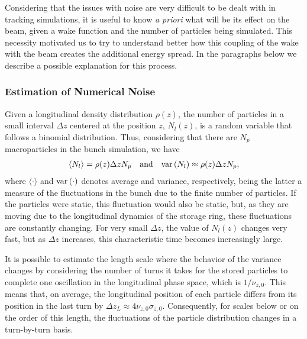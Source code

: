     Considering that the issues with noise are very difficult to be dealt with in tracking simulations, it is useful to know \emph{a priori} what will be its effect on the beam, given a wake function and the number of particles being simulated. This necessity motivated us to try to understand better how this coupling of the wake with the beam creates the additional energy spread. In the paragraphs below we describe a possible explanation for this process.

\subsubsection{Estimation of Numerical Noise}

    Given a longitudinal density distribution $\rho(z)$, the number of particles in a small interval $\Delta z$ centered at the position $z$, $N_l(z)$, is a random variable that follows a binomial distribution. Thus, considering that there are $N_p$ macroparticles in the bunch simulation, we have
    \begin{align}
        \langle N_l \rangle = \rho(z)\Delta z N_p
        \quad \text{and}\quad
        \text{var}\left(N_l\right) \approx \rho(z)\Delta z N_p,
    \end{align}
    where $\langle\cdot\rangle$ and $\text{var}\left(\cdot\right)$ denotes average and variance, respectively, being the latter a measure of the fluctuations in the bunch due to the finite number of particles. If the particles were static, this fluctuation would also be static, but, as they are moving due to the longitudinal dynamics of the storage ring, these fluctuations are constantly changing. For very small $\Delta z$, the value of $N_l(z)$ changes very fast, but as $\Delta z$ increases, this characteristic time becomes increasingly large.

    It is possible to estimate the length scale where the behavior of the variance changes by considering the number of turns it takes for the stored particles to complete one oscillation in the longitudinal phase space, which is $1/\nu_{z,0}$. This means that, on average, the longitudinal position of each particle differs from its position in the last turn by $\Delta z_L \approx 4\nu_{z,0}\sigma_{z,0}$. Consequently, for scales below or on the order of this length, the fluctuations of the particle distribution changes in a turn-by-turn basis.

